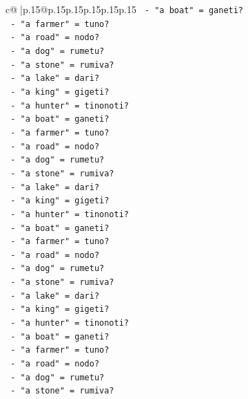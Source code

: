 \documentclass{article}
\begin{document}
{\begin{supertabular}{c@{$\;$}|p{.15\linewidth}@{}p{.15\linewidth}p{.15\linewidth}p{.15\linewidth}p{.15\linewidth}p{.15\linewidth}}
{{{\texttt{                {-} "a boat" = ganeti?} \\
\texttt{                {-} "a farmer" = tuno?} \\
\texttt{                {-} "a road" = nodo?} \\
\texttt{                {-} "a dog" = rumetu?} \\
\texttt{                {-} "a stone" = rumiva?} \\
\texttt{                {-} "a lake" = dari?} \\
\texttt{                {-} "a king" = gigeti?} \\
\texttt{                {-} "a hunter" = tinonoti?} \\
\texttt{                {-} "a boat" = ganeti?} \\
\texttt{                {-} "a farmer" = tuno?} \\
\texttt{                {-} "a road" = nodo?} \\
\texttt{                {-} "a dog" = rumetu?} \\
\texttt{                {-} "a stone" = rumiva?} \\
\texttt{                {-} "a lake" = dari?} \\
\texttt{                {-} "a king" = gigeti?} \\
\texttt{                {-} "a hunter" = tinonoti?} \\
\texttt{                {-} "a boat" = ganeti?} \\
\texttt{                {-} "a farmer" = tuno?} \\
\texttt{                {-} "a road" = nodo?} \\
\texttt{                {-} "a dog" = rumetu?} \\
\texttt{                {-} "a stone" = rumiva?} \\
\texttt{                {-} "a lake" = dari?} \\
\texttt{                {-} "a king" = gigeti?} \\
\texttt{                {-} "a hunter" = tinonoti?} \\
\texttt{                {-} "a boat" = ganeti?} \\
\texttt{                {-} "a farmer" = tuno?} \\
\texttt{                {-} "a road" = nodo?} \\
\texttt{                {-} "a dog" = rumetu?} \\
\texttt{                {-} "a stone" = rumiva?} \\
}}}
\end{supertabular}}
\end{document}
